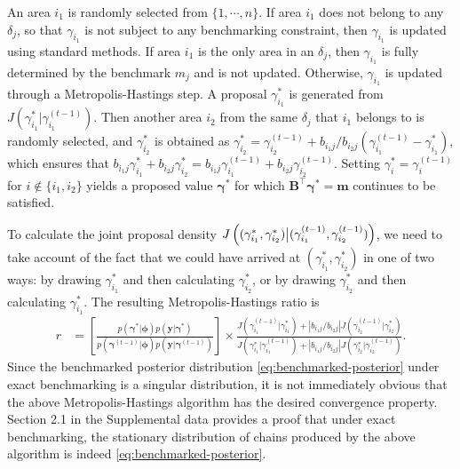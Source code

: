 \documentclass[12pt]{article}
\begin{document}
An area $i_1$ is randomly selected from $\{1,\cdots,n\}$.  If area $i_1$ does not belong to any $\delta_j$, so that $\gamma_{i_1}$ is not subject to any benchmarking constraint, then $\gamma_{i_1}$ is updated using standard methods. If area $i_1$ is the only area in an $\delta_j$, then $\gamma_{i_1}$ is fully determined by the benchmark $m_j$ and is not updated. Otherwise, $\gamma_{i_1}$ is updated through a Metropolis-Hastings step.  A proposal $\gamma_{i_1}^*$ is generated from $J(\gamma_{i_1}^*|\gamma_{i_1}^{(t-1)})$.  Then another area $i_2$ from the same $\delta_j$ that $i_1$ belongs to is randomly selected, and $\gamma_{i_2}^*$ is obtained as $\gamma_{i_2}^*=\gamma_{i_2}^{(t-1)}+b_{i_1 j}/b_{i_2 j}\left(\gamma_{i_1}^{(t-1)}-\gamma_{i_1}^*\right)$, which ensures that $b_{i_1j} \gamma_{i_1}^* + b_{i_2j}\gamma_{i_2}^*  = b_{i_1j}\gamma_{i_1}^{(t-1)}  + b_{i_2j}\gamma_{i_2}^{(t-1)}$. Setting $\gamma_{i}^{*} = \gamma_{i}^{(t-1)}$ for $i \notin \{i_1, i_2\}$ yields a proposed value $\bm{\gamma}^*$ for which $\bm{B}^{\top} \bm{\gamma}^* = \bm{m}$ continues to be satisfied.

To calculate the joint proposal density $J\left((\gamma_{i_1}^*,  \gamma_{i_2}^*) \big{|} (\gamma_{i_1}^{(t-1)}, \gamma_{i_2}^{(t-1)})\right)$, we need to take account of the fact that we could have arrived at $(\gamma_{i_1}^*,\gamma_{i_2}^*)$ in one of two ways: by drawing $\gamma_{i_1}^*$ and then calculating $\gamma_{i_2}^*$, or by drawing $\gamma_{i_2}^*$ and then calculating $\gamma_{i_1}^*$. The resulting Metropolis-Hastings ratio is
\begin{align}\label{eq:aratio_E1}
  r & = \left[\frac{p(\bm{\gamma}^*|\bm{\phi})p(\bm{y}|\bm{\gamma}^*)}{p(\bm{\gamma}^{(t-1)}|\bm{\phi})p(\bm{y}|\bm{\gamma}^{(t-1)})}\right]
  \times \frac{ J(\gamma_{i_1}^{(t-1)} | \gamma_{i_1}^*) +  \left|b_{i_1j}/b_{i_2j}\right|J(\gamma_{i_2}^{(t-1)} | \gamma_{i_2}^*)}
  {J(\gamma_{i_1}^* | \gamma_{i_1}^{(t-1)}) +  \left|b_{i_1j}/b_{i_2j}\right|J(\gamma_{i_2}^* | \gamma_{i_2}^{(t-1)})}.
\end{align}
Since the benchmarked posterior distribution \eqref{eq:benchmarked-posterior} under exact benchmarking is a singular distribution, it is not immediately obvious that the above Metropolis-Hastings algorithm has the desired convergence property. Section 2.1 in the Supplemental data provides a proof that under exact benchmarking, the stationary distribution of chains produced by the above algorithm is indeed \eqref{eq:benchmarked-posterior}.
\end{document}
